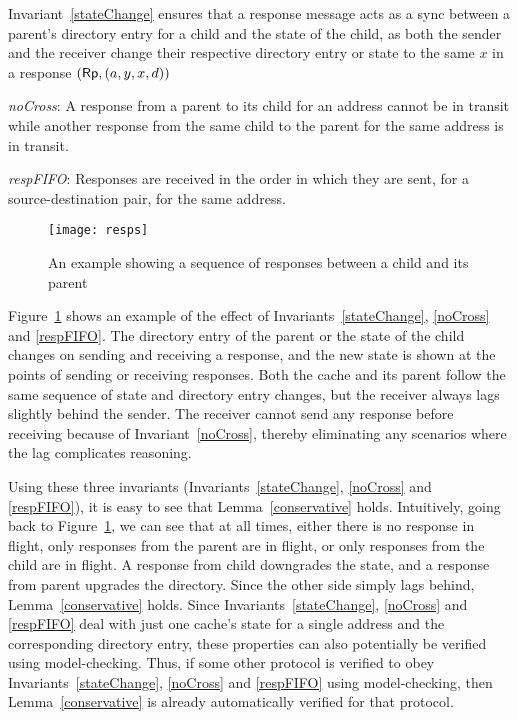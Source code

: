 \vspace{-.1in}

Invariant~\ref{stateChange} ensures that a response message acts as a sync
between a parent's directory entry for a child and the state of the child, as
both the sender and the receiver change their respective directory entry or
state to the same $x$ in a response $(\mathsf{Rp}, (a, y, x, d))$

\begin{inv}
\textit{noCross}: A response from a parent to its child for an address cannot
be in transit while another response from the same child to the parent for the
same address is in transit.
\label{noCross}
\end{inv}

\begin{inv}
\textit{respFIFO}: Responses are received in the order in which they are sent,
for a source-destination pair, for the same address.
\label{respFIFO}
\end{inv}

\begin{figure}
\centering
\texttt{[image: resps]}
\caption{An example showing a sequence of responses between a child and its parent}
\label{resps}
\end{figure}

Figure~\ref{resps} shows an example of the effect of
Invariants~\ref{stateChange}, \ref{noCross} and \ref{respFIFO}. The
directory entry of the parent or the state of the child changes on sending and
receiving a response, and the new state is shown at the points of sending or
receiving responses.  Both the cache and its parent follow the same sequence of
state and directory entry changes, but the receiver always lags slightly behind
the sender.  The receiver cannot send any response before receiving because of
Invariant~\ref{noCross}, thereby eliminating any scenarios where the lag
complicates reasoning.

Using these three invariants (Invariants~\ref{stateChange}, \ref{noCross} and
\ref{respFIFO}), it is easy to see that Lemma~\ref{conservative} holds.
Intuitively, going back to Figure~\ref{resps}, we can see that at all times,
either there is no response in flight, only responses from the parent are in
flight, or only responses from the child are in flight. A response from child
downgrades the state, and a response from parent upgrades the directory. Since
the other side simply lags behind, Lemma~\ref{conservative} holds.
Since Invariants~\ref{stateChange}, \ref{noCross} and \ref{respFIFO} deal with
just one cache's state for a single address and the corresponding directory
entry, these properties can also potentially be verified using model-checking.
Thus, if some other protocol is verified to obey Invariants~\ref{stateChange},
\ref{noCross} and \ref{respFIFO} using model-checking, then
Lemma~\ref{conservative} is already automatically verified for that
protocol.

